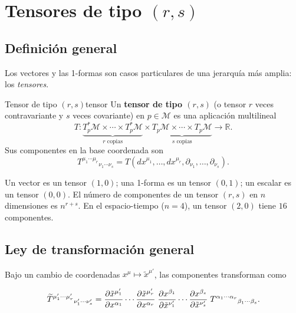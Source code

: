 \section{Tensores de tipo $(r,s)$}

\subsection{Definición general}

Los vectores y las 1-formas son casos particulares de una jerarquía más amplia: los \emph{tensores}.

\begin{definicion}{Tensor de tipo $(r,s)$}{tensor}
Un \textbf{tensor de tipo $(r,s)$} (o tensor $r$ veces contravariante y $s$ veces covariante) en $p \in \mathcal{M}$ es una aplicación multilineal
\[
  T: \underbrace{T_p^*\mathcal{M} \times \cdots \times T_p^*\mathcal{M}}_{r\text{ copias}} \times \underbrace{T_p\mathcal{M} \times \cdots \times T_p\mathcal{M}}_{s\text{ copias}} \longrightarrow \mathbb{R}.
\]
Sus componentes en la base coordenada son
\[
  T^{\mu_1 \cdots \mu_r}{}_{\nu_1 \cdots \nu_s} = T(dx^{\mu_1}, \ldots, dx^{\mu_r}, \partial_{\nu_1}, \ldots, \partial_{\nu_s}).
\]
\end{definicion}

Un vector es un tensor $(1,0)$; una 1-forma es un tensor $(0,1)$; un escalar es un tensor $(0,0)$. El número de componentes de un tensor $(r,s)$ en $n$ dimensiones es $n^{r+s}$. En el espacio-tiempo ($n=4$), un tensor $(2,0)$ tiene $16$ componentes.

\subsection{Ley de transformación general}

Bajo un cambio de coordenadas $x^\mu \mapsto \tilde{x}^{\mu'}$, las componentes transforman como

\begin{equation}
  \widetilde{T}^{\mu_1' \cdots \mu_r'}{}_{\nu_1' \cdots \nu_s'} =
  \dfrac{\partial \tilde{x}^{\mu_1'}}{\partial x^{\alpha_1}} \cdots \dfrac{\partial \tilde{x}^{\mu_r'}}{\partial x^{\alpha_r}}\;
  \dfrac{\partial x^{\beta_1}}{\partial \tilde{x}^{\nu_1'}} \cdots \dfrac{\partial x^{\beta_s}}{\partial \tilde{x}^{\nu_s'}}\;
  T^{\alpha_1 \cdots \alpha_r}{}_{\beta_1 \cdots \beta_s}.
  \label{eq:trans_tensor}
\end{equation}

